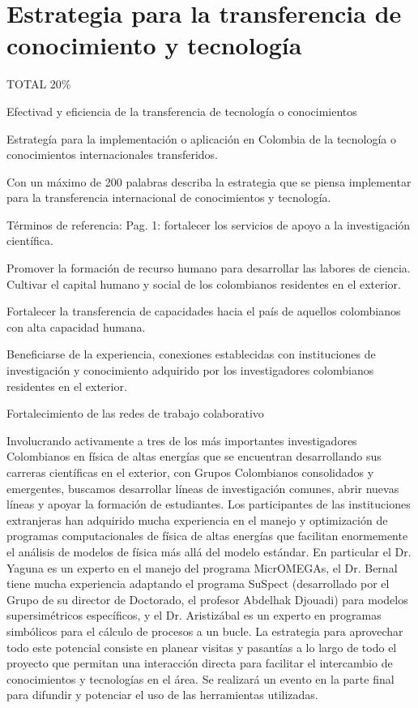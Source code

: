 \section{Estrategia para la transferencia de conocimiento y tecnología}
\begin{evaluacion}
  TOTAL 20\%

  Efectivad y eficiencia de la transferencia de tecnología o conocimientos 

  Estrategía para la implementación o aplicación en Colombia de la
  tecnología o conocimientos internacionales transferidos.
\end{evaluacion}

\begin{instrucciones}
Con un máximo de 200 palabras describa la estrategia que se piensa implementar para la transferencia internacional de conocimientos y tecnología.

  Términos de referencia:
  Pag. 1: fortalecer los servicios de apoyo a la investigación científica.

  Promover la formación de recurso humano para desarrollar las labores de ciencia. 
Cultivar el  capital humano y social de los colombianos residentes en el exterior.

Fortalecer la transferencia de capacidades hacia el país de aquellos colombianos con alta capacidad humana. 

Beneficiarse de la experiencia, conexiones establecidas con instituciones de investigación y conocimiento adquirido por los investigadores colombianos residentes en el exterior.

Fortalecimiento de las redes de trabajo colaborativo
\end{instrucciones}
Involucrando activamente a tres de los más importantes investigadores
Colombianos en física de altas energías que se encuentran
desarrollando sus carreras científicas en el exterior, con Grupos
Colombianos consolidados y emergentes, buscamos desarrollar líneas de
investigación comunes, abrir nuevas líneas y apoyar la formación de
estudiantes. Los participantes de las instituciones extranjeras han
adquirido mucha experiencia en el manejo y optimización de programas
computacionales de física de altas energías que facilitan enormemente
el análisis de modelos de física más allá del modelo estándar. En
particular el Dr. Yaguna es un experto en el manejo del programa
MicrOMEGAs, el Dr. Bernal tiene mucha experiencia adaptando el programa
SuSpect (desarrollado por el Grupo de su director de Doctorado, el
profesor Abdelhak Djouadi) para modelos supersimétricos específicos, y
el Dr. Aristizábal es un experto en programas simbólicos para el
cálculo de procesos a un bucle. La estrategia para aprovechar todo
este potencial consiste en planear visitas y pasantías a lo largo de
todo el proyecto que permitan una interacción directa para facilitar
el intercambio de conocimientos y tecnologías en el área. Se realizará
un evento en la parte final para difundir y potenciar el uso de las
herramientas utilizadas.



